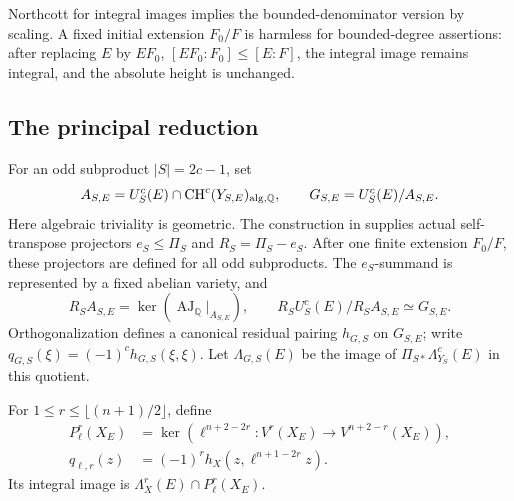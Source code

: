 \documentclass[11pt,a4paper]{article}
\theoremstyle{definition}
\newtheorem{definition}[theorem]{Definition}
\newcommand{\Q}{\mathbb Q}\newcommand{\R}{\mathbb R}\newcommand{\C}{\mathbb C}
\newcommand{\CH}{\operatorname{CH}}\newcommand{\Pic}{\operatorname{Pic}}
\newcommand{\AJ}{\operatorname{AJ}}\newcommand{\Tr}{\operatorname{Tr}}
\numberwithin{equation}{section}
\begin{document}

Northcott for integral images implies the bounded-denominator version
by scaling. A fixed initial extension \(F_0/F\) is harmless for
bounded-degree assertions: after replacing \(E\) by \(EF_0\),
\([EF_0:F_0]\le[E:F]\), the integral image remains integral, and
the absolute height is unchanged.





\subsection{The principal reduction}\label{sec:principal-reduction}

For an odd subproduct \(|S|=2c-1\), set
\[
 A_{S,E}=U_S^c(E)\cap\CH^c(Y_{S,E})_{\alg,\Q},
 \qquad G_{S,E}=U_S^c(E)/A_{S,E}.
\]
Here algebraic triviality is geometric. The construction in
 supplies actual self-transpose
projectors \(e_S\le\Pi_S\) and \(R_S=\Pi_S-e_S\). After one finite
extension \(F_0/F\), these projectors are defined for all odd
subproducts. The \(e_S\)-summand is represented by a fixed abelian
variety, and
\[
 R_SA_{S,E}=\ker(\AJ_\Q|_{A_{S,E}}),\qquad
 R_SU_S^c(E)/R_SA_{S,E}\simeq G_{S,E}.
\]
Orthogonalization defines a canonical residual pairing \(h_{G,S}\)
on \(G_{S,E}\); write \(q_{G,S}(\xi)=(-1)^ch_{G,S}(\xi,\xi)\).
Let \(\Lambda_{G,S}(E)\) be the image of
\(\Pi_{S*}\Lambda_{Y_S}^c(E)\) in this quotient.

For \(1\le r\le\lfloor(n+1)/2\rfloor\), define
\[
\begin{aligned}
 P_\ell^r(X_E)&=\ker\!\left(
   \ell^{n+2-2r}:V^r(X_E)\longrightarrow V^{n+2-r}(X_E)\right),\\
 q_{\ell,r}(z)&=(-1)^rh_X(z,\ell^{n+1-2r}z).
\end{aligned}
\]
Its integral image is \(\Lambda_X^r(E)\cap P_\ell^r(X_E)\).
\end{document}
